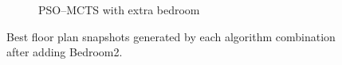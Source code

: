 \documentclass[]{article}
\begin{document}
\begin{figure}[ht]
\begin{subfigure}[b]{0.8\textwidth}
        \caption{PSO--MCTS with extra bedroom}
    \end{subfigure}
    \caption{Best floor plan snapshots generated by each algorithm combination after adding Bedroom2.}
    \label{fig:best-snapshots-2bed}
\end{figure}
\end{document}
